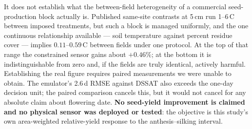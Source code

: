 It does not establish what the between-field heterogeneity of a commercial
seed-production block actually is. Published same-site contrasts at 5\,cm
run 1--6\,\textdegree C between imposed treatments, but such a block is
managed uniformly, and the one continuous relationship available
--- soil temperature against percent residue cover --- implies
$0.11$--$0.59$\,\textdegree C between fields under one protocol. At the top
of that range the constrained sensor gains about $+0.46\%$; at the bottom it
is indistinguishable from zero and, if the fields are truly identical,
actively harmful. Establishing the real figure requires paired measurements
we were unable to obtain. The emulator's 2.6\,d RMSE against DSSAT also
exceeds the one-day decision unit; the paired comparison cancels this, but
it would not cancel for any absolute claim about flowering date. \textbf{No seed-yield
improvement is claimed and no physical sensor was deployed or tested}: the
objective is this study's own area-weighted relative-yield response to the
anthesis--silking interval.
